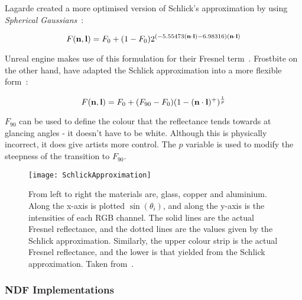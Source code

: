 Lagarde created a more optimised version of Schlick's approximation by using \textit{Spherical Gaussians}~\cite{LagardeSphericalGaussian}:

\begin{equation} \label{eq:SphericalGaussian}
	F(\mathbf{n}, \mathbf{l}) = F_0 + (1 - F_0)2^{(-5.55473(\mathbf{n}\cdot\mathbf{l}) - 6.98316)(\mathbf{n}\cdot\mathbf{l})}
\end{equation}

Unreal engine makes use of this formulation for their Fresnel term~\cite{RealShadingInUnreal}. Frostbite on the other hand, have adapted the Schlick approximation into a more flexible form~\cite{MovingFrostbitetoPBR}:

\begin{equation} \label{eq:FlexibleSchlickApproximation}
	F(\mathbf{n}, \mathbf{l}) = F_0 + (F_{90} - F_0)(1 - (\mathbf{n}\cdot\mathbf{l})^+)^\frac{1}{p}
\end{equation}

\begin{math}F_{90}\end{math} can be used to define the colour that the reflectance tends towards at glancing angles - it doesn't have to be white. Although this is physically incorrect, it does give artists more control. The \begin{math}p\end{math} variable is used to modify the steepness of the transition to \begin{math}F_{90}\end{math}.

\begin{figure}[h]
	\centering
	\texttt{[image: SchlickApproximation]}
	\caption{From left to right the materials are, glass, copper and aluminium. Along the x-axis is plotted \begin{math}\sin(\theta_i)\end{math}, and along the y-axis is the intensities of each RGB channel. The solid lines are the actual Fresnel reflectance, and the dotted lines are the values given by the Schlick approximation. Similarly, the upper colour strip is the actual Fresnel reflectance, and the lower is that yielded from the Schlick approximation. Taken from~\cite{RTR4}.}
	\label{fig:SchlickApproximation}
\end{figure}

\subsubsection{NDF Implementations}

